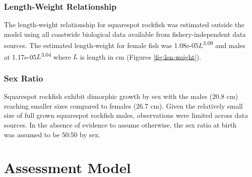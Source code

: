 \documentclass[11pt,
  english,
  a4paper,
]{article}
\begin{document}
\leavevmode\tagmcend\tagstructend\par


\hypertarget{length-weight-relationship}{%
\subsubsection{Length-Weight Relationship}\label{length-weight-relationship}}

\leavevmode\tagmcend\tagstructend


The length-weight relationship for squarespot rockfish was estimated outside the model using all coastwide biological data available from fishery-independent data sources. The estimated length-weight for female fish was 1.08e-05{\(L\)\leavevmode\tagmcend\tagstructend}\textsuperscript{3.09} and males at 1.17e-05{\(L\)\leavevmode\tagmcend\tagstructend}\textsuperscript{3.04} where {\(L\)\leavevmode\tagmcend\tagstructend} is length in cm (Figures \ref{fig:len-weight}).

\leavevmode\tagmcend\tagstructend\par


\hypertarget{sex-ratio}{%
\subsubsection{Sex Ratio}\label{sex-ratio}}

\leavevmode\tagmcend\tagstructend


Squarespot rockfish exhibit dimorphic growth by sex with the males (20.8 cm) reaching smaller sizes compared to females (26.7 cm). Given the relatively small size of full grown squarespot rockfish males, observations were limited across data sources. In the absence of evidence to assume otherwise, the sex ratio at birth was assumed to be 50:50 by sex.

\leavevmode\tagmcend\tagstructend\par


\hypertarget{assessment-model}{%
\section{Assessment Model}\label{assessment-model}}
\end{document}
